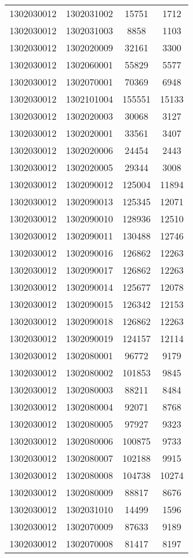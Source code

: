 \begin{longtable}{llcc}
1302030012 & 1302031002 & 15751 & 1712\\
1302030012 & 1302031003 & 8858 & 1103\\
1302030012 & 1302020009 & 32161 & 3300\\
1302030012 & 1302060001 & 55829 & 5577\\
1302030012 & 1302070001 & 70369 & 6948\\
1302030012 & 1302101004 & 155551 & 15133\\
1302030012 & 1302020003 & 30068 & 3127\\
1302030012 & 1302020001 & 33561 & 3407\\
1302030012 & 1302020006 & 24454 & 2443\\
1302030012 & 1302020005 & 29344 & 3008\\
1302030012 & 1302090012 & 125004 & 11894\\
1302030012 & 1302090013 & 125345 & 12071\\
1302030012 & 1302090010 & 128936 & 12510\\
1302030012 & 1302090011 & 130488 & 12746\\
1302030012 & 1302090016 & 126862 & 12263\\
1302030012 & 1302090017 & 126862 & 12263\\
1302030012 & 1302090014 & 125677 & 12078\\
1302030012 & 1302090015 & 126342 & 12153\\
1302030012 & 1302090018 & 126862 & 12263\\
1302030012 & 1302090019 & 124157 & 12114\\
1302030012 & 1302080001 & 96772 & 9179\\
1302030012 & 1302080002 & 101853 & 9845\\
1302030012 & 1302080003 & 88211 & 8484\\
1302030012 & 1302080004 & 92071 & 8768\\
1302030012 & 1302080005 & 97927 & 9323\\
1302030012 & 1302080006 & 100875 & 9733\\
1302030012 & 1302080007 & 102188 & 9915\\
1302030012 & 1302080008 & 104738 & 10274\\
1302030012 & 1302080009 & 88817 & 8676\\
1302030012 & 1302031010 & 14499 & 1596\\
1302030012 & 1302070009 & 87633 & 9189\\
1302030012 & 1302070008 & 81417 & 8197\\

\end{longtable}

